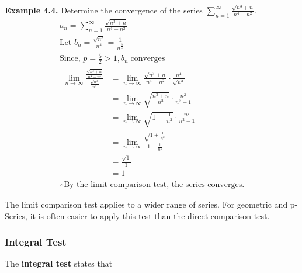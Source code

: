 \documentclass[12pt]{article}
\begin{document}
\textbf{Example 4.4.} Determine the convergence of the series $\displaystyle\sum_{n=1}^{\infty}\frac{\sqrt{n^3+n}}{n^4-n^2}$.
\begin{gather*}
	a_n = \displaystyle\sum_{n=1}^{\infty}\frac{\sqrt{n^3+n}}{n^4-n^2}  \\
	\text{Let } b_n = \frac{\sqrt{n^3}}{n^4} = \frac{1}{n^{\frac{5}{2}}} \\
	\text{Since, } p = \frac{5}{2} > 1, b_n \; \text{converges} \\
	\begin{aligned}
		\displaystyle\lim_{n\rightarrow\infty}\frac{\frac{\sqrt{n^3+n}}{n^4-n^2}}{\frac{\sqrt{n^3}}{n^4}} & = \displaystyle\lim_{n\rightarrow\infty}\frac{\sqrt{n^3+n}}{n^4-n^2} \cdot \frac{n^4}{\sqrt{n^3}} \\
		                                                                                                  & = \displaystyle\lim_{n\rightarrow\infty}\sqrt{\frac{{n^3+n}}{n^3}} \cdot \frac{n^2}{n^2-1}        \\
		                                                                                                  & = \displaystyle\lim_{n\rightarrow\infty}\sqrt{1+\frac{1}{n^2}} \cdot \frac{n^2}{n^2-1}            \\
		                                                                                                  & = \displaystyle\lim_{n\rightarrow\infty}\frac{\sqrt{1+\frac{1}{n^2}}}{1-\frac{1}{n^2}}            \\
		                                                                                                  & = \frac{\sqrt{1}}{1}                                                                              \\
		                                                                                                  & = 1
	\end{aligned} \\
	\therefore \text{By the limit comparison test, the series converges.}
\end{gather*}

The limit comparison test applies to a wider range of series. For geometric and p-Series, it is often easier to apply this test than the direct comparison test.

\subsubsection{Integral Test}

The \textbf{integral test} states that
\end{document}

